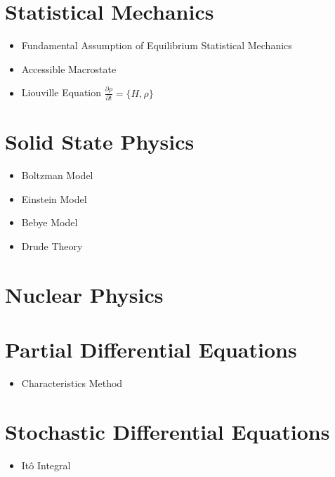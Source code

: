 \documentclass[10pt]{article}
\begin{document}
\section{Statistical Mechanics}
\begin{itemize}
	\item Fundamental Assumption of Equilibrium Statistical Mechanics
	\item Accessible Macrostate
	\item Liouville Equation $\frac{\partial \rho}{\partial t}=\{H,\rho\}$
\end{itemize}
\begin{refsection}
	\nocite{kittel1998thermal}
\printbibliography[heading=subbibliography,title={Recommended Books}]
\end{refsection}

\section{Solid State Physics}
\begin{itemize}
	\item Boltzman Model
	\item Einstein Model
	\item Bebye Model
	\item Drude Theory
\end{itemize}
\begin{refsection}
	\nocite{kittel2005introduction}
\printbibliography[heading=subbibliography,title={Recommended Books}]
\end{refsection}

\section{Nuclear Physics}

\section{Partial Differential Equations}
\begin{itemize}
	\item Characteristics Method
\end{itemize}
\begin{refsection}
	\nocite{salsa2016equazioni}
	\nocite{salsa2016partial}
\printbibliography[heading=subbibliography]
\end{refsection}

\section{Stochastic Differential Equations}
\begin{itemize}
	\item It\^o Integral
	\end{itemize}
\end{document}
